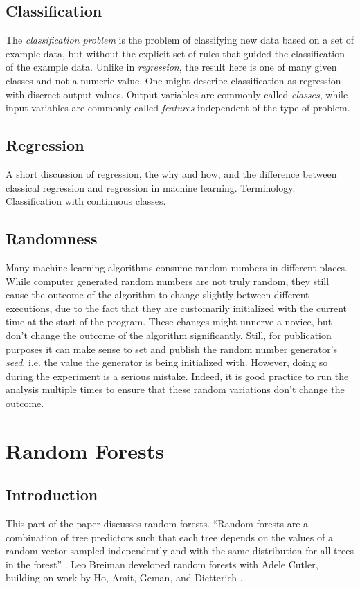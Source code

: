 \documentclass[a4paper,man,12pt,apacite]{apa6} %
\begin{document}
\subsection{Classification}
The \emph{classification problem} is the problem of classifying new data based
on a set of example data, but without the explicit set of rules that guided the
classification of the example data.
Unlike in \emph{regression}, the result here is one of many given classes
and not a numeric value.
One might describe classification as regression with discreet output values.
Output variables are commonly called \emph{classes}, while input variables
are commonly called \emph{features} independent of the type of problem.

\subsection{Regression}
A short discussion of regression, the why and how, and the difference
between classical regression and regression in machine learning.
Terminology. Classification with continuous classes.

\subsection{Randomness}
Many machine learning algorithms consume random numbers in different places.
While computer generated random numbers are not truly random, they still
cause the outcome of the algorithm to change slightly between different
executions, due to the fact that they are customarily initialized with
the current time at the start of the program.
These changes might unnerve a novice, but don't change the outcome of the
algorithm significantly.
Still, for publication purposes it can make sense to set and publish the
random number generator's \emph{seed}, i.e. the value the generator is being
initialized with.
However, doing so during the experiment
is a serious mistake.
Indeed, it is good practice to run the analysis multiple times to ensure
that these random variations don't change the outcome.


\section{Random Forests}

\subsection{Introduction}
This part of the paper discusses random forests.
“Random forests are a combination of tree predictors such that each tree
depends on the values of a random vector sampled independently and with
the same distribution for all trees in the forest” \cite{breiman2001random}.
Leo Breiman developed random forests with Adele Cutler, building on work
by Ho, Amit, Geman, and Dietterich \cite{wpRF}.
\end{document}

